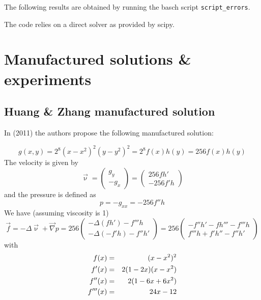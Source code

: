 The following results are obtained by running the basch script
{\tt script\_errors}.

The code relies on a direct solver as provided by scipy.




\newpage
\section*{Manufactured solutions \& experiments}

\subsection*{Huang \& Zhang manufactured solution}

In \textcite{huzh11} (2011) the authors propose the 
following manufactured solution:

\[
g(x,y)=2^8(x-x^2)^2(y-y^2)^2 = 2^8 f(x)h(y) = 256 f(x) h(y)
\]
The velocity is given by 
\[
\vec\upnu 
= 
\left(
\begin{array}{c}
g_y \\ -g_x
\end{array}
\right)
=
\left(
\begin{array}{c}
256 fh' \\
-256 f'h
\end{array}
\right)
\]
and the pressure is defined as
\[
p
= -g_{xx}
= -256 f'' h
\]
We have (assuming viscosity is 1) 
\[
\vec{f} = -\Delta \vec{\upnu} + \vec\nabla p
=256
\left(
\begin{array}{c}
- \Delta (fh') -f''' h  \\
-\Delta (-f'h) -f''h'
\end{array}
\right)
=256
\left(
\begin{array}{c}
- f''h' - fh''' -f''' h  \\
 f'''h + f'h''  -f''h'
\end{array}
\right)
\]
with
\begin{eqnarray}
f(x)&=& (x-x^2)^2 \nonumber\\
f'(x) &=& 2(1-2x)(x-x^2) \nonumber\\
f''(x) &=& 2(1-6x+6x^2) \nonumber\\
f'''(x) &=& 24x-12 \nonumber
\end{eqnarray}

